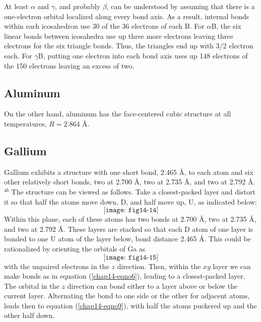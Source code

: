 At least $\alpha$ and $\gamma$, and probably $\beta$, can be understood 
by assuming that there is a one-electron orbital localized along every bond 
axis. 	As a result, internal bonds within each icosahedron use 30 of the 
36 electrons of each B.  For $\alpha$B, the six linear bonds between 
icosahedra use up three more electrons leaving three electrons for the 
six triangle bonds.  Thus, the triangles end up with 3/2 electron 
each.  For $\gamma$B, putting one electron into each bond axis uses up 
148 electrons of the 150 electrons leaving an excess of two.

\subsection{Aluminum}

On the other hand, aluminum has the face-centered cubic structure at 
all temperatures, $R = 2.864$ \AA.

\subsection{Gallium}

Gallium exhibits a structure with one short bond, 2.465 \AA, to each
atom and six other relatively short bonds, two at 2.700 \AA, two at
2.735 \AA, and two at 2.792 \AA.$^{4b}$ The structure can be viewed as
follows.  Take a closest-packed layer and distort it so that half the
atoms move down, D, and half move up, U, as indicated below:
\begin{equation}
\texttt{[image: fig14-14]}
\label{chap14-eqno10}
\end{equation}
Within this plane, each of these atoms has two bonds at 2.700 \AA, two at
2.735 \AA, and two at 2.792 \AA.  These layers are stacked so that each D atom 
of one layer is bonded to one U atom of the layer below, bond distance 
2.465 \AA.  This could be rationalized by orienting the orbitals of Ga as
\begin{equation}
\texttt{[image: fig14-15]}
\label{chap14-eqno11}
\end{equation}
with the unpaired electrons in the $z$ direction.  Then, within the
$xy$ layer we can make bonds as in equation (\ref{chap14-eqno6}),
leading to a closest-packed layer.  The orbital in the $z$ direction
can bond either to a layer above or below the current layer.
Alternating the bond to one side or the other for adjacent atoms,
leads then to equation (\ref{chap14-eqno9}), with half the atoms
puckered up and the other half down.

